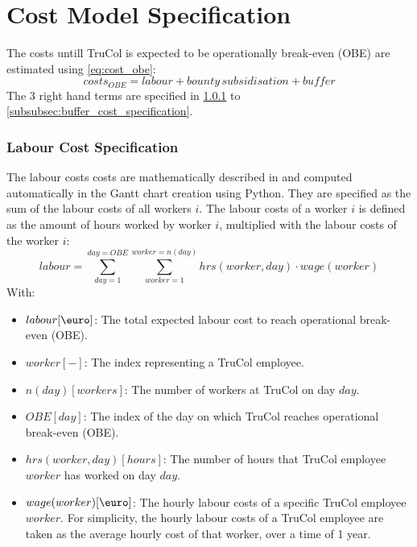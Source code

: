 \section{Cost Model Specification}\label{subsec:cost_model_specification}
The costs untill TruCol is expected to be operationally break-even (OBE) are estimated using \cref{eq:cost_obe}:
\begin{equation}
	costs_{OBE}=labour+{bounty\, subsidisation}+buffer
	\label{eq:cost_obe}
\end{equation}
The 3 right hand terms are specified in \cref{subsubsec:labour_cost_specification} to \cref{subsubsec:buffer_cost_specification}.

\subsubsection{Labour Cost Specification}\label{subsubsec:labour_cost_specification}
The labour costs costs are mathematically described in  and computed automatically in the Gantt chart creation using Python. They are specified as the sum of the labour costs of all workers $i$. The labour costs of a worker $i$ is defined as the amount of hours worked by worker $i$, multiplied with the labour costs of the worker $i$:
\begin{equation}
	labour=\sum_{day=1}^{day=OBE} \sum_{worker=1} ^{worker=n(day)} hrs(worker,day)\cdot wage(worker)
	\label{eq:labour_costs}
\end{equation}
With:
\begin{itemize}
	\item $labour [\text{\euro}]$: The total expected labour cost to reach operational break-even (OBE).
	\item $worker [-]$: The index representing a TruCol employee.
	\item $n(day) [workers]$: The number of workers at TruCol on day $day$.
	\item $OBE [day]$: The index of the day on which TruCol reaches operational break-even  (OBE).
	\item $hrs(worker,day) [hours]$: The number of hours that TruCol employee $worker$ has worked on day $day$.
	\item $wage(worker) [\text{\euro}]$: The hourly labour costs of a specific TruCol employee $worker$. For simplicity, the hourly labour costs of a TruCol employee are taken as the average hourly cost of that worker, over a time of 1 year.
\end{itemize}

